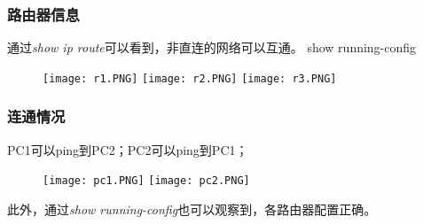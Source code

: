 \documentclass{article}
\begin{document}
\subsubsection{路由器信息}
通过\emph{show ip route}可以看到，非直连的网络可以互通。
show running-config
\begin{figure}[H]
    \centering
    \texttt{[image: r1.PNG]}
    \texttt{[image: r2.PNG]}
    \texttt{[image: r3.PNG]}
\end{figure} 

\subsubsection{连通情况}
PC1可以ping到PC2；PC2可以ping到PC1；
\begin{figure}[H]
    \centering
    \texttt{[image: pc1.PNG]}
    \texttt{[image: pc2.PNG]}
\end{figure} 
此外，通过\emph{show running-config}也可以观察到，各路由器配置正确。
\end{document}
